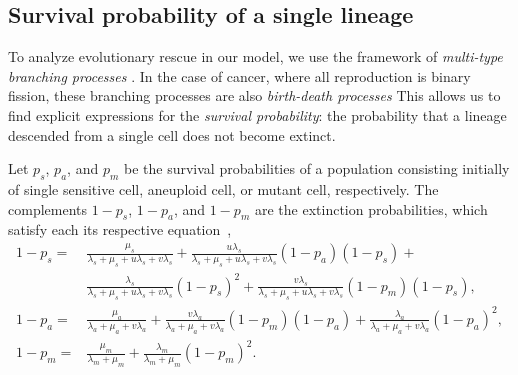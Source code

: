 \documentclass[12pt]{extarticle}
\begin{document}
\begin{appendices}
\renewcommand{\theequation}{\thesection\arabic{equation}}


\section{Survival probability of a single lineage}\label{sec:appendix-surv-prob}

To analyze evolutionary rescue in our model, we use the framework of \emph{multi-type branching processes} \citep{harris1963theory, weissman2009rate}. 
In the case of cancer, where all reproduction is binary fission, these branching processes are also \emph{birth-death processes} \citep{kendall1948}%
This allows us to find explicit expressions for the \emph{survival probability}: the probability that a lineage descended from a single cell does not become extinct.

Let $p_s$, $p_a$, and $p_m$ be the survival probabilities of a population consisting initially of single sensitive cell, aneuploid cell, or mutant cell, respectively.
The complements $1-p_s$, $1-p_a$, and $1-p_m$ are the extinction probabilities, which satisfy each its respective equation~\citep{harris1963theory},
\begin{equation} \label{eq:extinction_prob}
\begin{aligned}
1-p_s = &\frac{\mu_s}{\lambda_s+\mu_s+u\lambda_s+v\lambda_s} + 
		  \frac{u\lambda_s}{\lambda_s+\mu_s+u\lambda_s+v\lambda_s}\left(1-p_a\right)\left(1-p_s\right) + \\
		  & \frac{\lambda_s}{\lambda_s+\mu_s+u\lambda_s+v\lambda_s}\left(1-p_s\right)^2 +
		  \frac{v\lambda_s}{\lambda_s+\mu_s+u\lambda_s+v\lambda_s}\left(1-p_m\right)\left(1-p_s\right) ,\\
1-p_a = &\frac{\mu_a}{\lambda_a+\mu_a+v\lambda_a}+\frac{v\lambda_a}{\lambda_a+\mu_a+v\lambda_a}\left(1-p_m\right)\left(1-p_a\right)+\frac{\lambda_a}{\lambda_a+\mu_a+v\lambda_a}\left(1-p_a\right)^2 ,\\
1-p_m = &\frac{\mu_m}{\lambda_m+\mu_m}+\frac{\lambda_m}{\lambda_m+\mu_m}\left(1-p_m\right)^2 .	 
\end{aligned}
\end{equation}


\end{appendices}
\end{document}
